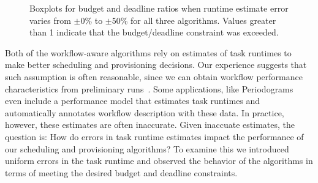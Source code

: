 \documentclass[conference]{IEEEtran}
\begin{document}
\begin{figure}[tb]
    \centering
    \hspace{2cm}
    \caption{Boxplots for budget and deadline ratios when runtime estimate 
    error varies from $\pm$0\% to $\pm$50\% for all three algorithms. Values 
    greater than 1 indicate that the budget/deadline constraint was exceeded.}
    \label{fig:variances}
\end{figure}

Both of the workflow-aware algorithms rely on estimates of task runtimes to make
better scheduling and provisioning decisions. Our experience suggests that such
assumption is often reasonable, since we can obtain workflow performance
characteristics from preliminary runs~\cite{Bharathi2008,Deelman2005,Juve2010}.
Some applications, like Periodograms~\cite{Vockler2011} even include a
performance model that estimates task runtimes and automatically annotates
workflow description with these data. In practice, however, these
estimates are often inaccurate. Given inaccuate estimates, the question is: How
do errors in task runtime estimates impact the performance of our scheduling and
provisioning algorithms?  To examine this we introduced uniform errors in the
task runtime and observed the behavior of the algorithms in terms of meeting the
desired budget and deadline constraints.
\end{document}
